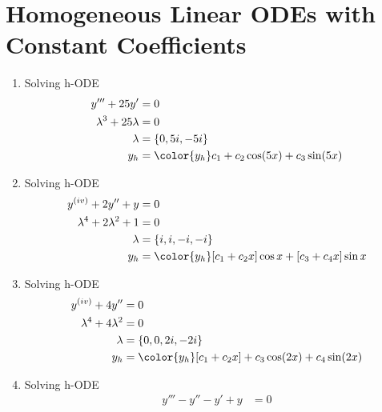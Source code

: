\section{Homogeneous Linear ODEs with Constant Coefficients}
\begin{enumerate}
    \item Solving h-ODE
          \begin{align}
              y''' + 25y'             & = 0                                                   \\
              \lambda^{3} + 25\lambda & = 0                                                   \\
              \lambda                 & = \{0, 5i, -5i\}                                      \\
              y_{h}                   & = {\color{y_h} c_{1} + c_{2}\cos(5x) + c_{3}\sin(5x)}
          \end{align}
    \item Solving h-ODE
          \begin{align}
              y^{(iv)} + 2y'' + y            & = 0                                      \\
              \lambda^{4} + 2\lambda^{2} + 1 & = 0                                      \\
              \lambda                        & = \{i, i, -i, -i\}                       \\
              y_{h}                          & = {\color{y_h} [c_{1} + c_{2}x] \cos x +
              [c_{3} + c_{4}x] \sin x}
          \end{align}
    \item Solving h-ODE
          \begin{align}
              y^{(iv)} + 4y''            & = 0                               \\
              \lambda^{4} + 4\lambda^{2} & = 0                               \\
              \lambda                    & = \{0, 0, 2i, -2i\}               \\
              y_{h}                      & = {\color{y_h} [c_{1} + c_{2}x] +
              c_{3}\cos(2x) + c_{4} \sin(2x)}
          \end{align}
    \item Solving h-ODE
          \begin{align}
              y''' - y'' - y' + y                     & = 0                                    \\

\end{align}
\end{enumerate}
